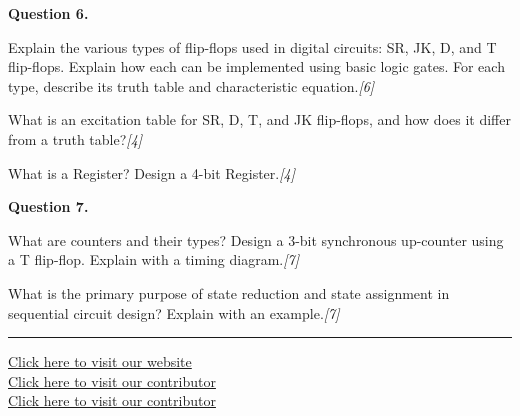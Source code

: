 \documentclass[11pt,a4paper]{article}
\newcommand{\pts}[1]{\hfill   \textit{[#1]}}
\begin{document}
\noindent   \textbf{Question 6.}

\begin{parts}
  \item Explain the various types of flip-flops used in digital circuits: SR, JK, D, and T flip-flops. Explain how each can be implemented using basic logic gates. For each type, describe its truth table and characteristic equation.\pts{6}
  \item What is an excitation table for SR, D, T, and JK flip-flops, and how does it differ from a truth table?\pts{4}
  \item What is a Register? Design a 4-bit Register.\pts{4}
\end{parts}

\bigskip



\noindent   \textbf{Question 7.}

\begin{parts}
  \item What are counters and their types? Design a 3-bit synchronous up-counter using a T flip-flop. Explain with a timing diagram.\pts{7}
  \item What is the primary purpose of state reduction and state assignment in sequential circuit design? Explain with an example.\pts{7}
\end{parts}

\vfill\rule{\linewidth}{0.4pt}

\begin{center}\small
  \href{https://bhu-exam.vercel.app/}{Click here to visit our website}\\[4pt]
  \href{https://me-aryan.vercel.app/}{Click here to visit our contributor}\\[4pt]
  \href{https://quashan-me.vercel.app/}{Click here to visit our contributor}
\end{center}
\end{document}
